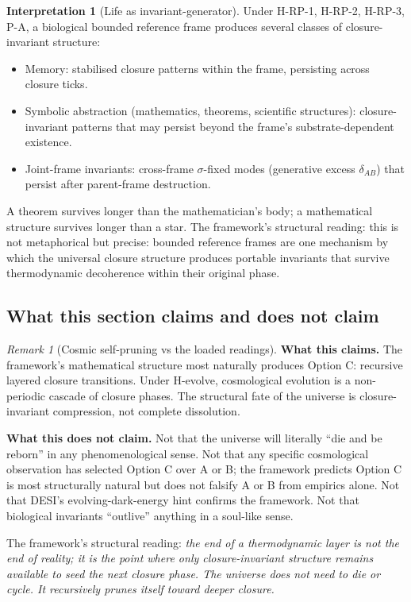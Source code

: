 \documentclass[11pt]{article}
\theoremstyle{plain}
\theoremstyle{definition}
\newtheorem{interpretation}[theorem]{Interpretation}
\theoremstyle{remark}
\newtheorem{remark}[theorem]{Remark}
\begin{document}
\begin{interpretation}[Life as invariant-generator]\label{int:life-invariant}
Under H-RP-1, H-RP-2, H-RP-3, P-A, a biological bounded reference frame produces several classes of closure-invariant structure:
\begin{itemize}[leftmargin=2em]
\item Memory: stabilised closure patterns within the frame, persisting across closure ticks.
\item Symbolic abstraction (mathematics, theorems, scientific structures): closure-invariant patterns that may persist beyond the frame's substrate-dependent existence.
\item Joint-frame invariants: cross-frame $\sigma$-fixed modes (generative excess $\delta_{AB}$) that persist after parent-frame destruction.
\end{itemize}
A theorem survives longer than the mathematician's body; a mathematical structure survives longer than a star. The framework's structural reading: this is not metaphorical but precise: bounded reference frames are one mechanism by which the universal closure structure produces portable invariants that survive thermodynamic decoherence within their original phase.
\end{interpretation}

\subsection{What this section claims and does not claim}

\begin{remark}[Cosmic self-pruning vs the loaded readings]\label{rem:cosmic-pruning-discipline}
\textbf{What this claims.} The framework's mathematical structure most naturally produces Option C: recursive layered closure transitions. Under H-evolve, cosmological evolution is a non-periodic cascade of closure phases. The structural fate of the universe is closure-invariant compression, not complete dissolution.

\textbf{What this does not claim.} Not that the universe will literally ``die and be reborn'' in any phenomenological sense. Not that any specific cosmological observation has selected Option C over A or B; the framework predicts Option C is most structurally natural but does not falsify A or B from empirics alone. Not that DESI's evolving-dark-energy hint confirms the framework. Not that biological invariants ``outlive'' anything in a soul-like sense.

The framework's structural reading: \emph{the end of a thermodynamic layer is not the end of reality; it is the point where only closure-invariant structure remains available to seed the next closure phase. The universe does not need to die or cycle. It recursively prunes itself toward deeper closure.}
\end{remark}
\end{document}
